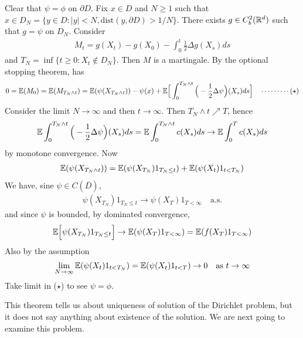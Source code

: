 \documentclass[12pt,a4paper]{report}
\newenvironment{proof}
{\begin{changemargin}{1cm}{0.5cm} 
	}%
	{\end{changemargin}
}
\begin{document}
\begin{proof}
\pf Clear that $\psi = \phi$ on $\partial D$. Fix $x\in D$ and $N\geq 1$ such that $x\in D_N = \{ y\in D : |y|<N, \text{dist}(y,\partial D) > 1/N \}$. There exists $g\in C_b^2(\mathbb{R}^d)$ such that $g= \psi$ on $D_N$. Consider
\begin{align*}
M_t = g(X_t) - g(X_0) - \int_0^t \frac{1}{2} \Delta g(X_s) ds
\end{align*}
and $T_N =\inf \{ t\geq 0 : X_t \not\in D_N \}$. Then $M$ is a martingale. By the optional stopping theorem, has
\begin{align*}
0 = \mathbb{E}(M_0) = \mathbb{E}(M_{T_N \wedge t} ) = \mathbb{E}(\psi(X_{T_N \wedge t})) - \psi(x) + \mathbb{E} \Big[ \int_0^{T_N \wedge t} \Big(-\frac{1}{2} \Delta \psi \Big) (X_s) ds \Big]  \quad \cdots \cdots\cdots (\star)
\end{align*}
Consider the limit $N\rightarrow \infty$ and then $t\rightarrow \infty$. Then $T_N \wedge t \nearrow T$, hence
\begin{align*}
\mathbb{E} \int_0^{T_N \wedge t} \Big(-\frac{1}{2} \Delta \psi\Big) (X_s) ds = \mathbb{E} \int_0^{T_N \wedge t} c(X_s) ds \rightarrow \mathbb{E} \int_0^T c(X_s) ds
\end{align*}
by monotone convergence. Now 
\begin{align*}
\mathbb{E}(\psi (X_{T_N \wedge t})) = \mathbb{E}( \psi(X_{T_N}) 1_{T_N \leq t} ) + \mathbb{E}(\psi(X_t) 1_{t< T_N})
\end{align*}
We have, sine $\psi \in C(\overline{D})$,
\begin{align*}
\psi(X_{T_N}) 1_{T_N \leq t} \rightarrow \psi(X_T) 1_{T< \infty} \quad \text{a.s.}
\end{align*}
and since $\psi$ is bounded, by dominated convergence,
\begin{align*}
\mathbb{E} \Big[ \psi(X_{T_N}) 1_{T_N \leq t} \Big] \rightarrow \mathbb{E} (\psi(X_T) 1_{T<\infty}) = \mathbb{E} (f(X_T) 1_{T<\infty})
\end{align*}
Also by the assumption
\begin{align*}
\lim_{N\rightarrow \infty} \mathbb{E} (\psi(X_t) 1_{t< T_N}) = \mathbb{E}(\psi(X_t) 1_{t<T}) \rightarrow 0 \quad \text{as } t\rightarrow \infty
\end{align*}
Take limit in ($\star$) to see $\psi = \phi$.
\eop
\end{proof}
\s

This theorem tells us about uniqueness of solution of the Dirichlet problem, but it does not say anything about existence of the solution. We are next going to examine this problem.
\s
\end{document}

